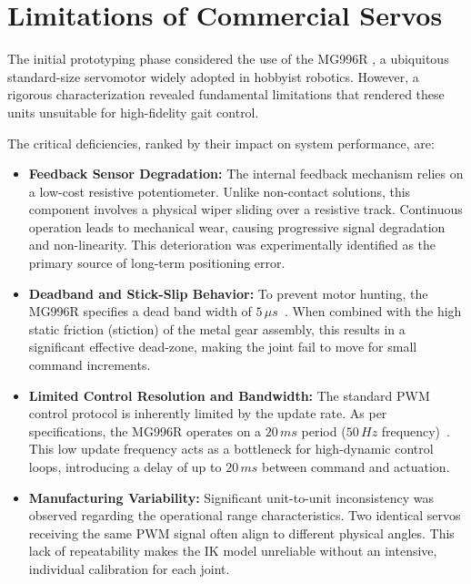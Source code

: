 \section{Limitations of Commercial Servos}
\label{sec:limitations}

The initial prototyping phase considered the use of the MG996R \cite{mg996r}, a ubiquitous standard-size
servomotor widely adopted in hobbyist robotics. However, a rigorous characterization revealed fundamental
limitations that rendered these units unsuitable for high-fidelity gait control.

The critical deficiencies, ranked by their impact on system performance, are:

\begin{itemize}
    \item \textbf{Feedback Sensor Degradation:} The internal feedback mechanism relies on a low-cost
        resistive potentiometer. Unlike non-contact solutions, this component involves a physical wiper
        sliding over a resistive track. Continuous operation leads to mechanical wear, causing progressive
        signal degradation and non-linearity. This deterioration was experimentally identified as the
        primary source of long-term positioning error.

    \item \textbf{Deadband and Stick-Slip Behavior:} To prevent motor hunting, the MG996R specifies a dead
        band width of $5\,\mu s$~\cite{mg996r}. When combined with the high static friction (stiction) of
        the metal gear assembly, this results in a significant effective dead-zone, making the joint fail
        to move for small command increments.

    \item \textbf{Limited Control Resolution and Bandwidth:} The standard PWM control protocol is inherently
        limited by the update rate. As per specifications, the MG996R operates on a $20\,ms$ period ($50\,Hz$
        frequency)~\cite{mg996r}. This low update frequency acts as a bottleneck for high-dynamic control loops,
        introducing a delay of up to $20\,ms$ between command and actuation.

    \item \textbf{Manufacturing Variability:} Significant unit-to-unit inconsistency was observed regarding
        the operational range characteristics. Two identical servos receiving the same PWM signal often
        align to different physical angles. This lack of repeatability makes the IK model unreliable without
        an intensive, individual calibration for each joint.


\end{itemize}
